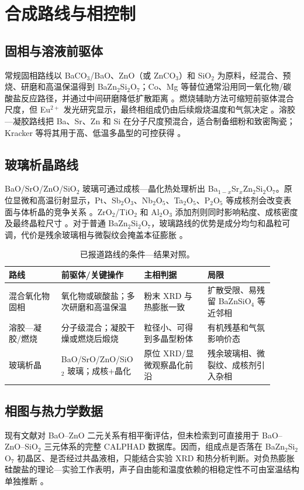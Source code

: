 \section{合成路线与相控制}

\subsection{固相与溶液前驱体}

常规固相路线以 BaCO$_3$/BaO、ZnO（或 ZnCO$_3$）和 SiO$_2$ 为原料，经混合、预烧、研磨和高温保温得到 BaZn$_2$Si$_2$O$_7$；Co、Mg 等替位通常沿用同一氧化物/碳酸盐反应路径，并通过中间研磨降低扩散距离 \cite{kerstan2013bazn2si2o7,thieme2016new,thieme2016cheminform}。燃烧辅助方法可缩短前驱体混合尺度，但 Eu$^{2+}$ 发光研究显示，最终相组成仍由后续煅烧温度和气氛决定 \cite{yao2010synthesis,yao2010synthesisx}。溶胶—凝胶路线把 Ba、Sr、Zn 和 Si 在分子尺度预混合，适合制备细粉和致密陶瓷；Kracker 等将其用于高、低温多晶型的可控获得 \cite{kracker2016sol}。

\subsection{玻璃析晶路线}

BaO/SrO/ZnO/SiO$_2$ 玻璃可通过成核—晶化热处理析出 Ba$_{1-x}$Sr$_x$Zn$_2$Si$_2$O$_7$。原位显微和高温衍射显示，Pt、Sb$_2$O$_3$、Nb$_2$O$_5$、Ta$_2$O$_5$、P$_2$O$_5$ 等成核剂会改变表面与体析晶的竞争关系 \cite{bocker2012in,vladislavova2017heterogeneous,vladislavova2019crystallization,heitmann2019surface,thieme2017on,vladislavova2018nucleation}。ZrO$_2$/TiO$_2$ 和 Al$_2$O$_3$ 添加剂则同时影响粘度、成核密度及最终晶粒尺寸 \cite{vladislavova2018crystallisation,thieme2017effect}。对于普通 BaZn$_2$Si$_2$O$_7$，玻璃路线的优势是成分均匀和晶粒可调，代价是残余玻璃相与微裂纹会掩盖本征膨胀 \cite{thieme2016thermal,thieme2015high}。

\begin{table}[t]
\centering
\caption{已报道路线的条件—结果对照。}
\begin{tabular}{P{0.19\linewidth}P{0.24\linewidth}P{0.23\linewidth}P{0.24\linewidth}}
\toprule
路线 & 前驱体/关键操作 & 主相判据 & 局限 \\
\midrule
混合氧化物固相 & 氧化物或碳酸盐；多次研磨和高温保温 & 粉末 XRD 与热膨胀一致 & 扩散受限、易残留 BaZnSiO$_4$ 等近邻相 \cite{kerstan2013bazn2si2o7} \\
溶胶—凝胶/燃烧 & 分子级混合；凝胶干燥或燃烧后煅烧 & 粒径小、可得到多晶型粉体 & 有机残基和气氛影响价态 \cite{kracker2016sol,yao2010synthesis} \\
玻璃析晶 & BaO/SrO/ZnO/SiO$_2$ 玻璃；成核+晶化 & 原位 XRD/显微观察晶化前沿 & 残余玻璃相、微裂纹、成核剂引入杂相 \cite{bocker2012in,vladislavova2017heterogeneous} \\
\bottomrule
\end{tabular}
\end{table}

\subsection{相图与热力学数据}

现有文献对 BaO--ZnO 二元关系有相平衡评估，但未检索到可直接用于 BaO--ZnO--SiO$_2$ 三元体系的完整 CALPHAD 数据库。因而，组成点是否落在 BaZn$_2$Si$_2$O$_7$ 初晶区、是否经过共晶液相，只能结合实验 XRD 和热分析判断。对负热膨胀硅酸盐的理论—实验工作表明，声子自由能和温度依赖的相稳定性不可由室温结构单独推断 \cite{erlebach2021phase}。
